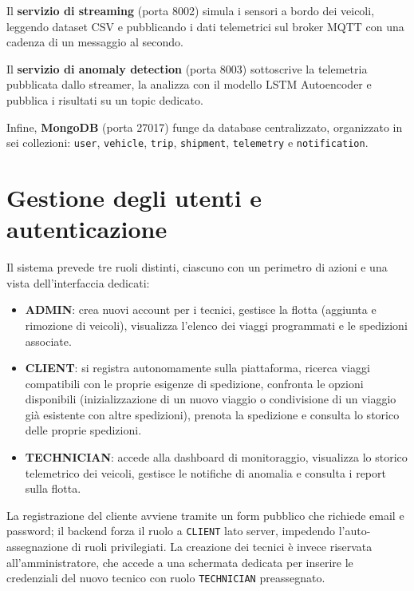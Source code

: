 Il \textbf{servizio di streaming} (porta 8002) simula i sensori a bordo dei veicoli, leggendo dataset CSV e pubblicando i dati telemetrici sul broker MQTT con una cadenza di un messaggio al secondo.

Il \textbf{servizio di anomaly detection} (porta 8003) sottoscrive la telemetria pubblicata dallo streamer, la analizza con il modello LSTM Autoencoder e pubblica i risultati su un topic dedicato.

Infine, \textbf{MongoDB} (porta 27017) funge da database centralizzato, organizzato in sei collezioni: \texttt{user}, \texttt{vehicle}, \texttt{trip}, \texttt{shipment}, \texttt{telemetry} e \texttt{notification}.


\section{Gestione degli utenti e autenticazione}
\label{sec:autenticazione}

Il sistema prevede tre ruoli distinti, ciascuno con un perimetro di azioni e una vista dell'interfaccia dedicati:

\begin{itemize}
    \item \textbf{ADMIN}: crea nuovi account per i tecnici, gestisce la flotta (aggiunta e rimozione di veicoli), visualizza l'elenco dei viaggi programmati e le spedizioni associate.
    \item \textbf{CLIENT}: si registra autonomamente sulla piattaforma, ricerca viaggi compatibili con le proprie esigenze di spedizione, confronta le opzioni disponibili (inizializzazione di un nuovo viaggio o condivisione di un viaggio già esistente con altre spedizioni), prenota la spedizione e consulta lo storico delle proprie spedizioni.
    \item \textbf{TECHNICIAN}: accede alla dashboard di monitoraggio, visualizza lo storico telemetrico dei veicoli, gestisce le notifiche di anomalia e consulta i report sulla flotta.
\end{itemize}

La registrazione del cliente avviene tramite un form pubblico che richiede email e password; il backend forza il ruolo a \texttt{CLIENT} lato server, impedendo l'auto-assegnazione di ruoli privilegiati. La creazione dei tecnici è invece riservata all'amministratore, che accede a una schermata dedicata per inserire le credenziali del nuovo tecnico con ruolo \texttt{TECHNICIAN} preassegnato.

